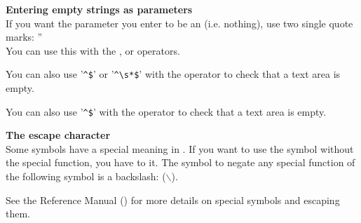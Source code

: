 
\textbf{Entering empty strings as parameters}\\
If you want the parameter you enter to be an  (i.e. nothing), use two single quote marks: ''\\

You can use this with the ,  or  operators.

You can also use '\verb+^$+' or '\verb+^\s*$+' with the operator  to check that a text area is empty.  

You can also use '\verb+^$+' with the operator  to check that a text area is empty.  


\textbf{The escape character}\\
Some symbols have a special meaning in \app{}. If you want to use the symbol without the special function, you have to  it. The symbol to negate any special function of the following symbol is a backslash: ($\backslash$). 
                          
See the Reference Manual () for more details on special symbols and escaping them.


